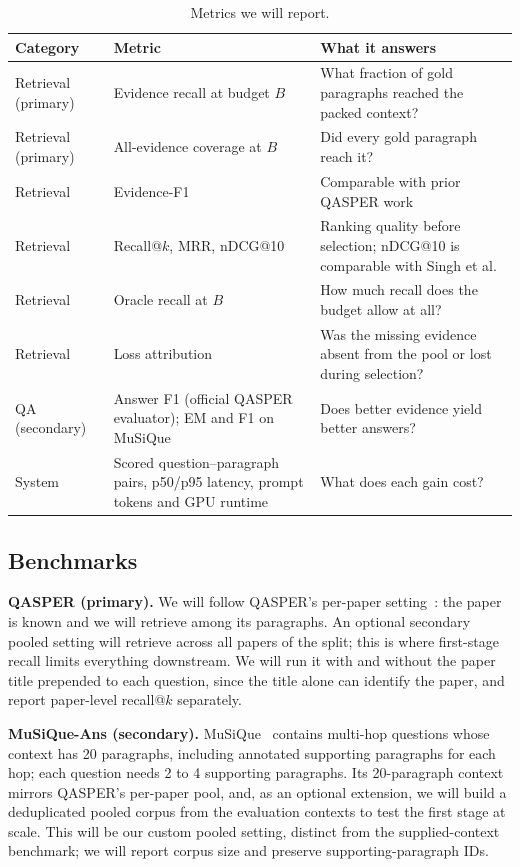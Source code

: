 \documentclass[sigconf, nonacm]{acmart}
\newcommand{\minihead}[1]{{\noindent\textbf{#1.} }}
\begin{document}
\begin{table}[t]
  \caption{Metrics we will report.}
  \label{tab:metrics}
  \footnotesize
  \begin{tabularx}{\columnwidth}{P{1.3cm}P{2.4cm}Y}
    \toprule
    Category & Metric & What it answers \\
    \midrule
    Retrieval (primary) & Evidence recall at budget $B$ & What fraction of gold paragraphs reached the packed context? \\
    Retrieval (primary) & All-evidence coverage at $B$ & Did every gold paragraph reach it? \\
    Retrieval & Evidence-F1~\cite{dasigi2021qasper} & Comparable with prior QASPER work \\
    Retrieval & Recall@$k$, MRR, nDCG@10 & Ranking quality before selection; nDCG@10 is comparable with Singh et al.~\cite{singh2026beyond} \\
    Retrieval & Oracle recall at $B$ & How much recall does the budget allow at all? \\
    Retrieval & Loss attribution & Was the missing evidence absent from the pool or lost during selection? \\
    QA (secondary) & Answer F1 (official QASPER evaluator); EM and F1 on MuSiQue & Does better evidence yield better answers? \\
    System & Scored question--paragraph pairs, p50/p95 latency, prompt tokens and GPU runtime & What does each gain cost? \\
    \bottomrule
  \end{tabularx}
\end{table}

\subsection{Benchmarks}

\minihead{QASPER (primary)} We will follow QASPER's per-paper setting~\cite{dasigi2021qasper}: the paper is known and we will retrieve among its paragraphs. An optional secondary pooled setting will retrieve across all papers of the split; this is where first-stage recall limits everything downstream. We will run it with and without the paper title prepended to each question, since the title alone can identify the paper, and report paper-level recall@$k$ separately.

\minihead{MuSiQue-Ans (secondary)} MuSiQue~\cite{trivedi2022musique} contains multi-hop questions whose context has 20 paragraphs, including annotated supporting paragraphs for each hop; each question needs 2 to 4 supporting paragraphs. Its 20-paragraph context mirrors QASPER's per-paper pool, and, as an optional extension, we will build a deduplicated pooled corpus from the evaluation contexts to test the first stage at scale. This will be our custom pooled setting, distinct from the supplied-context benchmark; we will report corpus size and preserve supporting-paragraph IDs.
\end{document}

